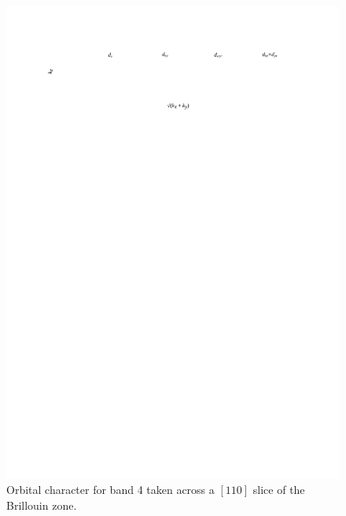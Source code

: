 \begin{figure}[h!]
    \begin{center}
        \includegraphics[scale=0.7]{Chapter-dHvABaFe2P2/Figures/AngleDepMeasurements/BandCharacterPlot/Band4_110Slice_BandCharacter}
        \caption{Orbital character for band 4 taken across a $[110]$ slice of the Brillouin zone.}
        \label{Fig:Appendix:BandCharacter110Band4}
    \end{center}
\end{figure}
